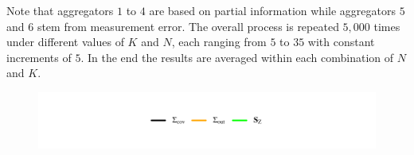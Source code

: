 \documentclass[11pt]{article}
\theoremstyle{definition}
\theoremstyle{definition}
\begin{document}
Note that aggregators $1$ to $4$ are based on partial information while aggregators $5$ and $6$ stem from measurement error. The overall process is repeated $5,000$ times under different values of $K$ and $N$, each ranging from $5$ to $35$ with constant increments of $5$. In the end the results are averaged within each combination of $N$ and $K$.


\begin{figure}[t!]
\vspace{-2em}
\centering
\hspace*{0em} 	\includegraphics{legendSim.pdf} %
\vspace{-4em}


\end{figure}
\end{document}

